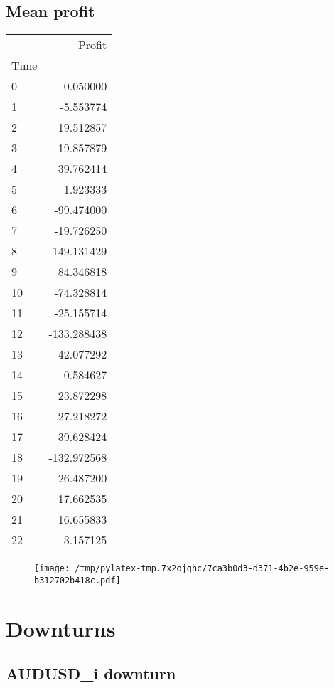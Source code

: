 \documentclass{article}%
\begin{document}
\subsection{Mean profit }%
\label{subsec:Meanprofit}%
\begin{tabular}{lr}
\toprule
{} &      Profit \\
Time &             \\
\midrule
0    &    0.050000 \\
1    &   -5.553774 \\
2    &  -19.512857 \\
3    &   19.857879 \\
4    &   39.762414 \\
5    &   -1.923333 \\
6    &  -99.474000 \\
7    &  -19.726250 \\
8    & -149.131429 \\
9    &   84.346818 \\
10   &  -74.328814 \\
11   &  -25.155714 \\
12   & -133.288438 \\
13   &  -42.077292 \\
14   &    0.584627 \\
15   &   23.872298 \\
16   &   27.218272 \\
17   &   39.628424 \\
18   & -132.972568 \\
19   &   26.487200 \\
20   &   17.662535 \\
21   &   16.655833 \\
22   &    3.157125 \\
\bottomrule
\end{tabular}
%


\begin{figure}[htbp]%
\centering%
\texttt{[image: /tmp/pylatex-tmp.7x2ojghc/7ca3b0d3-d371-4b2e-959e-b312702b418c.pdf]}%
\end{figure}

%
\newpage %
\section{Downturns}%
\label{sec:Downturns}%
\subsection{AUDUSD\_i downturn}%
\label{subsec:AUDUSDidownturn}%
\end{document}
